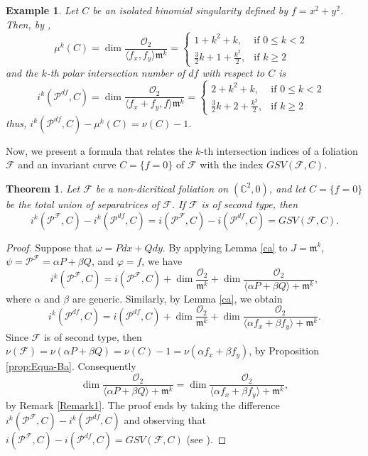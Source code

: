 \documentclass[12pt,letterpaper]{amsart}
\newcommand{\C}{\mathbb{C}}
\newcommand{\F}{\mathcal{F}}
\newcommand{\m}{\mathfrak{m}}
\newtheorem{theorem}{Theorem}[section]
\newtheorem{example}{Example}[section]
\begin{document}
\begin{example}
    Let $C$ be an isolated binomial singularity defined by $f=x^2+y^2$. Then, by \cite[Proposition 2.7]{k-Milnor},
     $$
\mu^{k}(C)= \dim\frac{\mathcal{O}_2}{\langle f_x,f_y\rangle\m^{k}}=\begin{cases}
			1+k^{2}+k,& \text{if $0\leq k< 2$ }\\
            \frac{3}{2}k+1+\frac{k^{2}}{2}, & \text{if $k\geq 2$}
		 \end{cases}
$$
and the $k$-th polar intersection number of $df$ with respect to $C$ is 
$$
i^{k}(\mathcal{P}^{df},C)= \dim\frac{\mathcal{O}_2}{\langle f_x+ f_y, f\rangle\m^k}=\begin{cases}
			2+k^{2}+k,& \text{if $0\leq k< 2$ }\\
            \frac{3}{2}k+2+\frac{k^{2}}{2}, & \text{if $k\geq 2$}
		 \end{cases}
$$
thus, $i^{k}(\mathcal{P}^{df},C)-\mu^{k}(C)=\nu (C)-1$.
\end{example}
Now, we present a formula that relates the $k$-th intersection indices of a foliation $\F$ and an invariant curve $C=\{f=0\}$ of $\F$ with the index $GSV(\F,C)$.
\begin{theorem}
    Let $\F$ be a non-dicritical foliation on $(\C^2,0)$, and let $C=\{f=0\}$ be the total union of separatrices of $\F$. If $\F$ is of second type, then
    \[i^k(\mathcal{P}^{\F},C)-i^k(\mathcal{P}^{df},C)=i(\mathcal{P}^{\F},C)-i(\mathcal{P}^{df},C)=GSV(\F,C).\]
\end{theorem}
\begin{proof}
Suppose that $\omega=Pdx+Qdy$. By applying Lemma \ref{ca} to $J=\m^{k}$, $\psi=\mathcal{P}^{\F}=\alpha P+\beta Q$, and $\varphi=f$, we have
\[i^k(\mathcal{P}^{\F},C)=i(\mathcal{P}^{\F},C)+\dim\frac{\mathcal{O}_2}{\m^{k}}+\dim\frac{\mathcal{O}_2}{\langle \alpha P+\beta Q\rangle+\m^{k}},\]
where $\alpha$ and $\beta$ are generic. Similarly, by Lemma \ref{ca}, we obtain
\[i^k(\mathcal{P}^{df},C)=i(\mathcal{P}^{df},C)+\dim\frac{\mathcal{O}_2}{\m^{k}}+\dim\frac{\mathcal{O}_2}{\langle \alpha f_x+\beta f_y\rangle+\m^{k}}.\]
Since $\F$ is of second type, then $\nu(\F)=\nu(\alpha P+\beta Q)=\nu(C)-1=\nu(\alpha f_x+\beta f_y)$, by Proposition \ref{prop:Equa-Ba}. Consequently 
\[\dim\frac{\mathcal{O}_2}{\langle \alpha P+\beta Q\rangle+\m^{k}}=\dim\frac{\mathcal{O}_2}{\langle \alpha f_x+\beta f_y\rangle+\m^{k}},\]
by Remark \ref{Remark1}. The proof ends by taking the difference $i^k(\mathcal{P}^{\F},C)-i^k(\mathcal{P}^{df},C)$ and observing that $i(\mathcal{P}^{\F},C)-i(\mathcal{P}^{df},C)=GSV(\F,C)$ (see \cite[Proposition 5.4]{Evelia}).
\end{proof}
\end{document}
